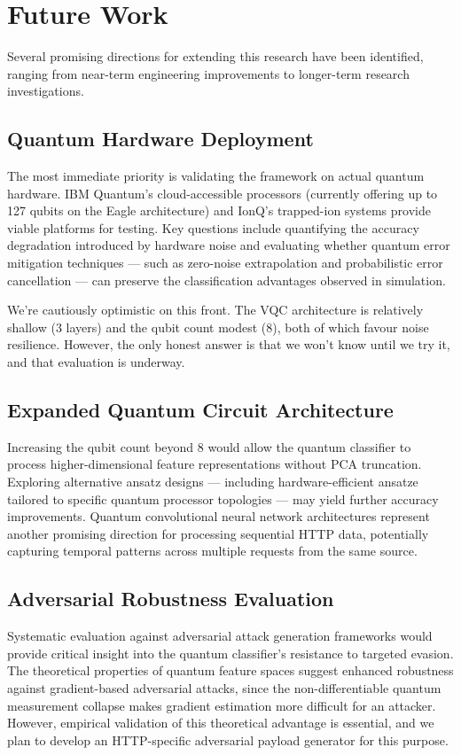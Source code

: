 \documentclass[journal,onecolumn]{IEEEtran}
\begin{document}
\section{Future Work}
\label{sec:future}

Several promising directions for extending this research have been identified, ranging from near-term engineering improvements to longer-term research investigations.

\subsection{Quantum Hardware Deployment}
The most immediate priority is validating the framework on actual quantum hardware. IBM Quantum's cloud-accessible processors (currently offering up to 127 qubits on the Eagle architecture) and IonQ's trapped-ion systems provide viable platforms for testing. Key questions include quantifying the accuracy degradation introduced by hardware noise and evaluating whether quantum error mitigation techniques --- such as zero-noise extrapolation and probabilistic error cancellation --- can preserve the classification advantages observed in simulation.

We're cautiously optimistic on this front. The VQC architecture is relatively shallow (3 layers) and the qubit count modest (8), both of which favour noise resilience. However, the only honest answer is that we won't know until we try it, and that evaluation is underway.

\subsection{Expanded Quantum Circuit Architecture}
Increasing the qubit count beyond 8 would allow the quantum classifier to process higher-dimensional feature representations without PCA truncation. Exploring alternative ansatz designs --- including hardware-efficient ansatze tailored to specific quantum processor topologies --- may yield further accuracy improvements. Quantum convolutional neural network architectures represent another promising direction for processing sequential HTTP data, potentially capturing temporal patterns across multiple requests from the same source.

\subsection{Adversarial Robustness Evaluation}
Systematic evaluation against adversarial attack generation frameworks would provide critical insight into the quantum classifier's resistance to targeted evasion. The theoretical properties of quantum feature spaces suggest enhanced robustness against gradient-based adversarial attacks, since the non-differentiable quantum measurement collapse makes gradient estimation more difficult for an attacker. However, empirical validation of this theoretical advantage is essential, and we plan to develop an HTTP-specific adversarial payload generator for this purpose.
\end{document}
